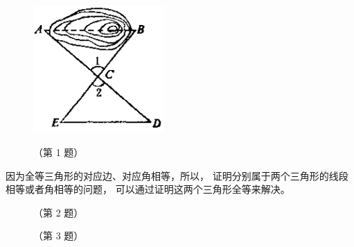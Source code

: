 \begin{figure}[htbp]
    \centering
    \begin{minipage}[b]{7cm}
        \centering
        \includegraphics[width=5cm]{../pic/czjh1-ch3-20.png}
        \caption{}\label{fig:czjh1-3-20}
    \end{minipage}
    \qquad
    \begin{minipage}[b]{7cm}
        \centering
        
        \caption*{（第 1 题）}
    \end{minipage}
\end{figure}


因为全等三角形的对应边、对应角相等，所以，
证明分别属于两个三角形的线段相等或者角相等的问题，
可以通过证明这两个三角形全等来解决。


\begin{lianxi}




\begin{figure}[htbp]
    \centering
    \begin{minipage}[b]{7cm}
        \centering
        
        \caption*{（第 2 题）}
    \end{minipage}
    \qquad
    \begin{minipage}[b]{7cm}
        \centering
        
        \caption*{（第 3 题）}
    \end{minipage}
\end{figure}


\end{lianxi}
